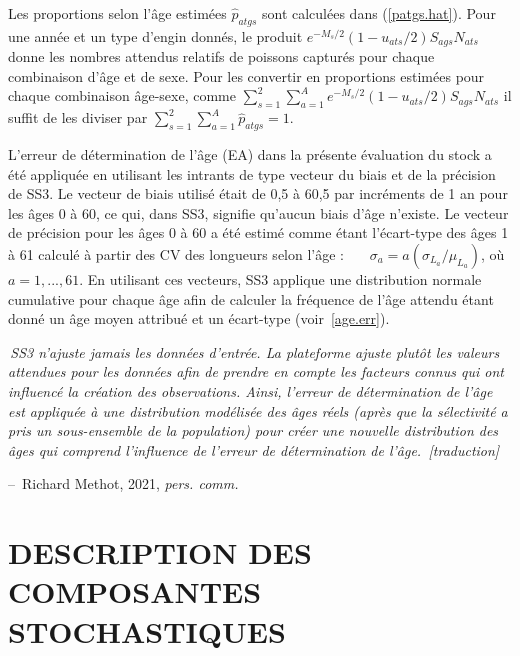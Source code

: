 \documentclass[11pt]{book}
\makeatletter
\newcommand{\angL}{\guillemotleft\,}
\newcommand{\angR}{\,\guillemotright}
\newenvironment{chapquote}[2][2em]
  {\setlength{\@tempdima}{#1}%
   \def\chapquote@author{#2}%
   \parshape 1 \@tempdima \dimexpr\textwidth-2\@tempdima\relax%
   \itshape}
  {\par\normalfont\hfill--\ \chapquote@author\hspace*{\@tempdima}\par\smallskip}
\newcommand{\eref}[1]{(\ref{#1})}
\makeatother
\begin{document}
Les proportions selon l'\^{a}ge estim\'{e}es $\widehat{p}_{atgs}$ sont calcul\'{e}es dans \eref{patgs.hat}. 
Pour une ann\'{e}e et un type d'engin donn\'{e}s, le produit $e^{-M_{s}/2} (1 - u_{ats}/2) S_{ags} N_{ats}$ donne les nombres attendus relatifs de poissons captur\'{e}s pour chaque combinaison d'\^{a}ge et de sexe. Pour les convertir en proportions estim\'{e}es pour chaque combinaison \^{a}ge-sexe, comme $\sum_{s=1}^2 \sum_{a=1}^A e^{-M_{s}/2} (1 - u_{ats}/2) S_{ags} N_{ats}$ il suffit de les diviser par $\sum_{s=1}^2 \sum_{a=1}^{A} \widehat{p}_{atgs} = 1$.

L'erreur de d\'{e}termination de l'\^{a}ge (EA) dans la pr\'{e}sente \'{e}valuation du stock a \'{e}t\'{e} appliqu\'{e}e en utilisant les intrants de type vecteur du biais et de la pr\'{e}cision de SS3. Le vecteur de biais utilis\'{e} \'{e}tait de 0,5 \`{a} 60,5 par incr\'{e}ments de 1 an pour les \^{a}ges 0 \`{a} 60, ce qui, dans SS3, signifie qu'aucun biais d'\^{a}ge n'existe. Le vecteur de pr\'{e}cision pour les \^{a}ges 0 \`{a} 60 a \'{e}t\'{e} estim\'{e} comme \'{e}tant l'\'{e}cart-type des \^{a}ges 1 \`{a} 61 calcul\'{e} \`{a} partir des CV des longueurs selon l'\^{a}ge :
~~~$\sigma_a = a (\sigma_{L_a} / \mu_{L_a})$, o\`{u} $a=1,...,61$.
En utilisant ces vecteurs, SS3 applique une distribution normale cumulative pour chaque \^{a}ge afin de calculer la fr\'{e}quence de l'\^{a}ge attendu \'{e}tant donn\'{e} un \^{a}ge moyen attribu\'{e} et un \'{e}cart-type (voir~\ref{age.err}).

\begin{chapquote}{Richard Methot, 2021, \textit{pers. comm.}}
\angL{}SS3 n'ajuste jamais les donn\'{e}es d'entr\'{e}e. La plateforme ajuste plut\^{o}t les valeurs attendues pour les donn\'{e}es afin de prendre en compte les facteurs connus qui ont influenc\'{e} la cr\'{e}ation des observations. Ainsi, l'erreur de d\'{e}termination de l'\^{a}ge est appliqu\'{e}e \`{a} une distribution mod\'{e}lis\'{e}e des \^{a}ges r\'{e}els (apr\`{e}s que la s\'{e}lectivit\'{e} a pris un sous-ensemble de la population) pour cr\'{e}er une nouvelle distribution des \^{a}ges qui comprend l'influence de l'erreur de d\'{e}termination de l'\^{a}ge.\angR{} [traduction]
\end{chapquote}

\section{DESCRIPTION DES COMPOSANTES STOCHASTIQUES}
\end{document}
